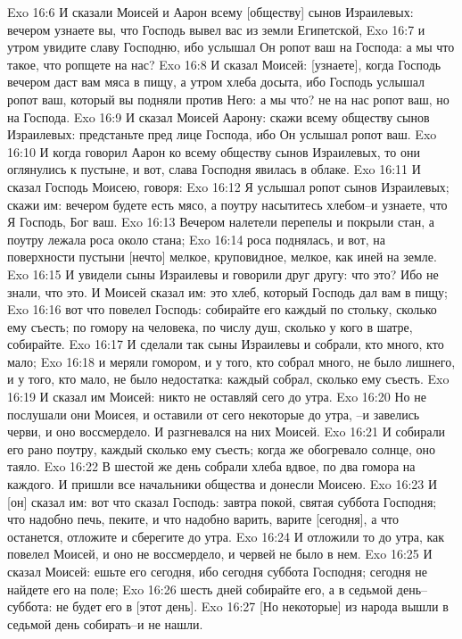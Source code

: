Exo 16:6  И сказали Моисей и Аарон всему [обществу] сынов Израилевых: вечером узнаете вы, что Господь вывел вас из земли Египетской,
Exo 16:7  и утром увидите славу Господню, ибо услышал Он ропот ваш на Господа: а мы что такое, что ропщете на нас?
Exo 16:8  И сказал Моисей: [узнаете], когда Господь вечером даст вам мяса в пищу, а утром хлеба досыта, ибо Господь услышал ропот ваш, который вы подняли против Него: а мы что? не на нас ропот ваш, но на Господа.
Exo 16:9  И сказал Моисей Аарону: скажи всему обществу сынов Израилевых: предстаньте пред лице Господа, ибо Он услышал ропот ваш.
Exo 16:10  И когда говорил Аарон ко всему обществу сынов Израилевых, то они оглянулись к пустыне, и вот, слава Господня явилась в облаке.
Exo 16:11  И сказал Господь Моисею, говоря:
Exo 16:12  Я услышал ропот сынов Израилевых; скажи им: вечером будете есть мясо, а поутру насытитесь хлебом--и узнаете, что Я Господь, Бог ваш.
Exo 16:13  Вечером налетели перепелы и покрыли стан, а поутру лежала роса около стана;
Exo 16:14  роса поднялась, и вот, на поверхности пустыни [нечто] мелкое, круповидное, мелкое, как иней на земле.
Exo 16:15  И увидели сыны Израилевы и говорили друг другу: что это? Ибо не знали, что это. И Моисей сказал им: это хлеб, который Господь дал вам в пищу;
Exo 16:16  вот что повелел Господь: собирайте его каждый по стольку, сколько ему съесть; по гомору на человека, по числу душ, сколько у кого в шатре, собирайте.
Exo 16:17  И сделали так сыны Израилевы и собрали, кто много, кто мало;
Exo 16:18  и меряли гомором, и у того, кто собрал много, не было лишнего, и у того, кто мало, не было недостатка: каждый собрал, сколько ему съесть.
Exo 16:19  И сказал им Моисей: никто не оставляй сего до утра.
Exo 16:20  Но не послушали они Моисея, и оставили от сего некоторые до утра, --и завелись черви, и оно воссмердело. И разгневался на них Моисей.
Exo 16:21  И собирали его рано поутру, каждый сколько ему съесть; когда же обогревало солнце, оно таяло.
Exo 16:22  В шестой же день собрали хлеба вдвое, по два гомора на каждого. И пришли все начальники общества и донесли Моисею.
Exo 16:23  И [он] сказал им: вот что сказал Господь: завтра покой, святая суббота Господня; что надобно печь, пеките, и что надобно варить, варите [сегодня], а что останется, отложите и сберегите до утра.
Exo 16:24  И отложили то до утра, как повелел Моисей, и оно не воссмердело, и червей не было в нем.
Exo 16:25  И сказал Моисей: ешьте его сегодня, ибо сегодня суббота Господня; сегодня не найдете его на поле;
Exo 16:26  шесть дней собирайте его, а в седьмой день--суббота: не будет его в [этот день].
Exo 16:27  [Но некоторые] из народа вышли в седьмой день собирать--и не нашли.
